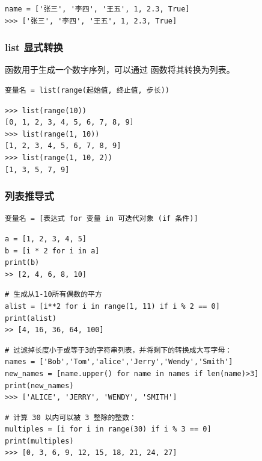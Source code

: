 \begin{lstlisting}[style=demostyle,numbers=none]
name = ['张三', '李四', '王五', 1, 2.3, True]
>>> ['张三', '李四', '王五', 1, 2.3, True]
\end{lstlisting}

\subsubsection{list 显式转换}
 函数用于生成一个数字序列，可以通过  函数将其转换为列表。
\begin{lstlisting}[style=demostyle,numbers=none]
变量名 = list(range(起始值, 终止值, 步长))
\end{lstlisting}

\begin{lstlisting}[style=demostyle,numbers=none]
>>> list(range(10))
[0, 1, 2, 3, 4, 5, 6, 7, 8, 9]
>>> list(range(1, 10))
[1, 2, 3, 4, 5, 6, 7, 8, 9]
>>> list(range(1, 10, 2))
[1, 3, 5, 7, 9]
\end{lstlisting}

\subsubsection{列表推导式}
\begin{lstlisting}[style=demostyle,numbers=none]
变量名 = [表达式 for 变量 in 可迭代对象 (if 条件)]
\end{lstlisting}

\begin{lstlisting}[style=pythonstyle]
a = [1, 2, 3, 4, 5]
b = [i * 2 for i in a]
print(b)
>> [2, 4, 6, 8, 10]
\end{lstlisting}

\begin{lstlisting}[style=pythonstyle]
# 生成从1-10所有偶数的平方
alist = [i**2 for i in range(1, 11) if i % 2 == 0]
print(alist)
>> [4, 16, 36, 64, 100]
\end{lstlisting}

\begin{lstlisting}[style=pythonstyle]
# 过滤掉长度小于或等于3的字符串列表，并将剩下的转换成大写字母：
names = ['Bob','Tom','alice','Jerry','Wendy','Smith']
new_names = [name.upper() for name in names if len(name)>3]
print(new_names)
>>> ['ALICE', 'JERRY', 'WENDY', 'SMITH']
\end{lstlisting}

\begin{lstlisting}[style=pythonstyle]
# 计算 30 以内可以被 3 整除的整数：
multiples = [i for i in range(30) if i % 3 == 0]
print(multiples)
>>> [0, 3, 6, 9, 12, 15, 18, 21, 24, 27]
\end{lstlisting}


